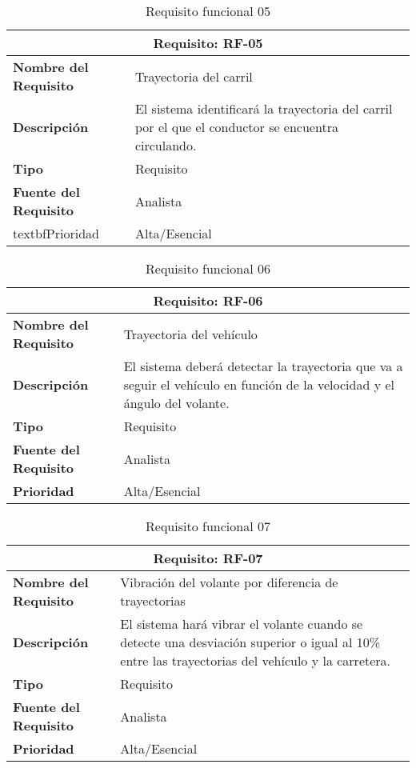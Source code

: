 \begin{table}[H]
\begin{center}
\begin{tabular}{p{} p{7cm}}
\multicolumn{2}{c}{\textbf{Requisito: RF-05} } \\
\hline \hline
\textbf{Nombre del Requisito} & Trayectoria del carril\\
\hline
\textbf{Descripción} & El sistema identificará la trayectoria del carril por el que el conductor se encuentra circulando. \\
\hline
\textbf{Tipo} & Requisito  \\
\hline
\textbf{Fuente del Requisito} & Analista \\
\hline
textbf{Prioridad} & Alta/Esencial  \\ \hline
\end{tabular}
\caption{Requisito funcional 05}
\label{tab:RF-05}
\end{center}
\end{table}

\begin{table}[H]
\begin{center}
\begin{tabular}{p{} p{7cm}}
\multicolumn{2}{c}{\textbf{Requisito: RF-06} } \\
\hline \hline
\textbf{Nombre del Requisito} & Trayectoria del vehículo\\
\hline
\textbf{Descripción} & El sistema deberá detectar la trayectoria que va a seguir el vehículo en función de la velocidad y el ángulo del volante. \\
\hline
\textbf{Tipo} & Requisito  \\
\hline
\textbf{Fuente del Requisito} & Analista \\
\hline
\textbf{Prioridad} & Alta/Esencial  \\ \hline
\end{tabular}
\caption{Requisito funcional 06}
\label{tab:RF-06}
\end{center}
\end{table}

\begin{table}[H]
\begin{center}
\begin{tabular}{p{} p{7cm}}
\multicolumn{2}{c}{\textbf{Requisito: RF-07} } \\
\hline \hline
\textbf{Nombre del Requisito} &  Vibración del volante por diferencia de trayectorias\\
\hline
\textbf{Descripción} & El sistema hará vibrar el volante cuando se detecte una desviación superior o igual al 10\% entre las trayectorias del vehículo y la carretera. \\
\hline
\textbf{Tipo} & Requisito  \\
\hline
\textbf{Fuente del Requisito} & Analista \\
\hline
\textbf{Prioridad} & Alta/Esencial  \\ \hline
\end{tabular}
\caption{Requisito funcional 07}
\label{tab:RF-07}
\end{center}
\end{table}

